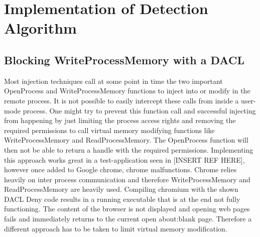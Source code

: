 \section{Implementation of Detection Algorithm}
\label{chap_implementation}
\subsection{Blocking WriteProcessMemory with a DACL}
\label{sec:implementation_dacl}
Most injection techniques call at some point in time the two important OpenProcess and WriteProcessMemory functions to inject into or modify in the remote process. It is not possible to easily intercept these calls from inside a user-mode process. One might try to prevent this function call and successful injecting from happening by just limiting the process access rights and removing the required permissions to call virtual memory modifying functions like WriteProcessMemory and ReadProcessMemory. The OpenProcess function will then not be able to return a handle with the required permissions. Implementing this approach works great in a test-application seen in [INSERT REF HERE], however once added to Google chrome, chrome malfunctions. Chrome relies heavily on inter process communication and therefore WriteProcessMemory and ReadProcessMemory are heavily used. Compiling chromium with the shown DACL Deny code results in a running executable that is at the end not fully functioning. The content of the browser is not displayed and opening web pages fails and immediately returns to the current open about:blank page. Therefore a different approach has to be taken to limit virtual memory modification.

